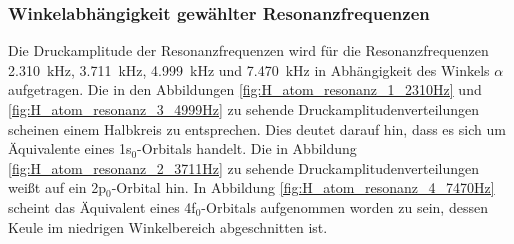         \subsubsection*{Winkelabhängigkeit gewählter Resonanzfrequenzen}
            Die Druckamplitude der Resonanzfrequenzen wird für die Resonanzfrequenzen \SI{2.310}{\kilo\hertz}, \SI{3.711}{\kilo\hertz}, \SI{4.999}{\kilo\hertz} und \SI{7.470}{\kilo\hertz} in Abhängigkeit des 
            Winkels $\alpha$ aufgetragen. Die in den Abbildungen \ref{fig:H_atom_resonanz_1_2310Hz} und \ref{fig:H_atom_resonanz_3_4999Hz} zu sehende Druckamplitudenverteilungen scheinen einem Halbkreis zu 
            entsprechen. Dies deutet darauf hin, dass es sich um Äquivalente eines 1s$_0$-Orbitals handelt. Die in Abbildung \ref{fig:H_atom_resonanz_2_3711Hz} zu sehende Druckamplitudenverteilungen weißt auf 
            ein 2p$_0$-Orbital hin. In Abbildung \ref{fig:H_atom_resonanz_4_7470Hz} scheint das Äquivalent eines 4f$_0$-Orbitals aufgenommen worden zu sein, dessen Keule im niedrigen Winkelbereich abgeschnitten 
            ist.
            \FloatBarrier
